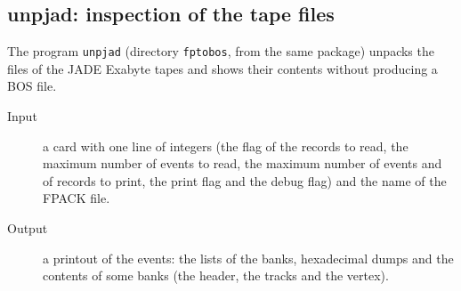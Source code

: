 \subsection{unpjad: inspection of the tape files}
The program \texttt{unpjad} (directory \texttt{fptobos}, from the same package) unpacks the files of the JADE Exabyte tapes and shows their contents without
producing a BOS file.
\begin{description}
\item[Input] a card with one line of integers (the flag of the records to read, the maximum number of events to read, the maximum number of events and of records to
print, the print flag and the debug flag) and the name of the FPACK file.
\item[Output] a printout of the events: the lists of the banks, hexadecimal dumps and the contents of some banks (the header, the tracks and the vertex).
\end{description}

